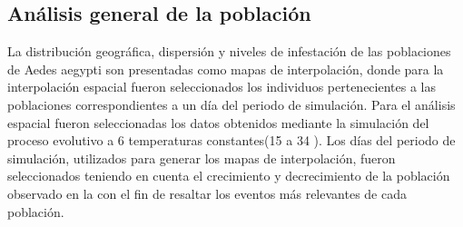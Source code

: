 \subsection{Análisis general de la población}
La distribución geográfica, dispersión y niveles de infestación de las poblaciones de Aedes aegypti
son presentadas como mapas de interpolación, donde para la interpolación espacial fueron
seleccionados los individuos pertenecientes a las poblaciones correspondientes a un día del
periodo de simulación. Para el análisis espacial fueron seleccionadas los datos obtenidos mediante
la simulación del proceso evolutivo a 6 temperaturas constantes(15 a 34 \textcelsius). Los días
del periodo de simulación, utilizados para generar los mapas de interpolación, fueron
seleccionados teniendo en cuenta el crecimiento y decrecimiento de la población observado en
la  con el fin de resaltar los eventos más relevantes de cada
población.

